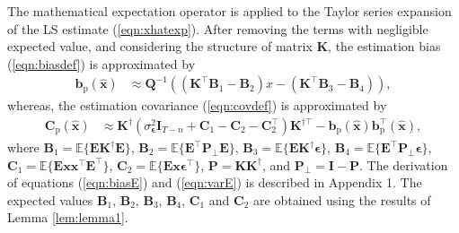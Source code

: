 The mathematical expectation operator is applied to the Taylor series expansion of the LS estimate (\ref{eqn:xhatexp}).
After removing the terms with negligible expected value, and considering the structure of matrix $\mathbf{K}$, the estimation bias (\ref{eqn:biasdef}) is approximated by 
\begin{equation} \begin{aligned} \mathbf{b}_{\mathrm{p}} \left( \widehat{\mathbf{x}} \right) & \approx \mathbf{Q}^{-1} \left( \left( \mathbf{K}^\top \mathbf{B}_1 - \mathbf{B}_2 \right) x - \left( \mathbf{K}^\top \mathbf{B}_3 - \mathbf{B}_4 \right) \right) , \end{aligned} \label{eqn:biasE} \end{equation}
whereas, the estimation covariance (\ref{eqn:covdef}) is approximated by 
\begin{equation} \begin{aligned} \mathbf{C}_{\mathrm{p}} \left( \widehat{\mathbf{x}} \right) & \approx \mathbf{K}^\dagger \left( \sigma_{\bm{\epsilon}}^2 \mathbf{I}_{T-n} + \mathbf{C}_1 - \mathbf{C}_2 - \mathbf{C}_2^\top \right) \mathbf{K}^{\dagger \top} - \mathbf{b}_{\mathrm{p}} \left( \widehat{\mathbf{x}} \right) \mathbf{b}_{\mathrm{p}}^\top \left( \widehat{\mathbf{x}} \right) , \end{aligned} \label{eqn:varE} \end{equation}
where $\mathbf{B}_1 = \mathbb{E} \Big\{ \mathbf{E} \mathbf{K}^\dagger \mathbf{E} \Big\}$, $\mathbf{B}_2 = \mathbb{E} \Big\{ \mathbf{E}^\top \mathbf{P}_\perp \mathbf{E} \Big\}$, $\mathbf{B}_3 = \mathbb{E} \Big\{ \mathbf{E} \mathbf{K}^\dagger \bm{\epsilon} \Big\}$, $\mathbf{B}_4 = \mathbb{E} \Big\{ \mathbf{E}^\top \mathbf{P}_\perp \bm{\epsilon} \Big\}$, $\mathbf{C}_1 = \mathbb{E} \Big\{ \mathbf{E} \mathbf{x} \mathbf{x}^\top \mathbf{E}^\top \Big\}$, $\mathbf{C}_2 = \mathbb{E} \Big\{ \mathbf{E} \mathbf{x} \bm{\epsilon}^\top \Big\}$, $\mathbf{P} = \mathbf{K} \mathbf{K}^\dagger$, and $\mathbf{P}_\perp = \mathbf{I} - \mathbf{P}$. 
The derivation of equations (\ref{eqn:biasE}) and (\ref{eqn:varE}) is described in Appendix 1.
The expected values $\mathbf{B}_1$, $\mathbf{B}_2$, $\mathbf{B}_3$, $\mathbf{B}_4$, $\mathbf{C}_1$ and $\mathbf{C}_2$ are obtained using the results of Lemma \ref{lem:lemma1}.



